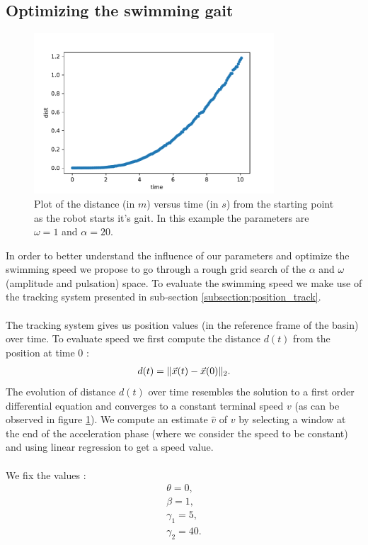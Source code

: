 \documentclass[11pt]{article}
\DeclarePairedDelimiter\norm{\lVert}{\rVert}%
\begin{document}
\subsection{Optimizing the swimming gait}
\label{experiments}
\begin{figure}
    \centering
    \includegraphics[width=0.8\textwidth]{figures/out-20-1_5-1.pdf}
    \caption{Plot of the distance (in $m$) versus time (in $s$) from the starting point as the robot starts it's gait. In this example the parameters are $\omega = 1$ and $\alpha = 20$.}
    \label{fig:trajectory_1}
\end{figure}
In order to better understand the influence of our parameters and optimize the swimming speed we propose to go through a rough grid search of the $\alpha$ and $\omega$ (amplitude and pulsation) space. To evaluate the swimming speed we make use of the tracking system presented in sub-section \ref{subsection:position_track}. 
\\ \\
The tracking system gives us position values (in the reference frame of the basin) over time. To evaluate speed we first compute the distance $d(t)$ from the position at time 0 :
\begin{align}
    d(t) = \norm{\vec{x}(t)-\vec{x}(0)}_2.
\end{align}
The evolution of distance $d(t)$ over time resembles the solution to a first order differential equation and converges to a constant terminal speed $v$ (as can be observed in figure \ref{fig:trajectory_1}). We compute an estimate $\hat{v}$ of $v$ by selecting a window at the end of the acceleration phase (where we consider the speed to be constant) and using linear regression to get a speed value. 
\\ \\
We fix the values :
\begin{align*}
	\theta = 0,\\
	\beta = 1,\\
	\gamma_1  = 5,\\
	\gamma_2 = 40.
\end{align*}
\end{document}
